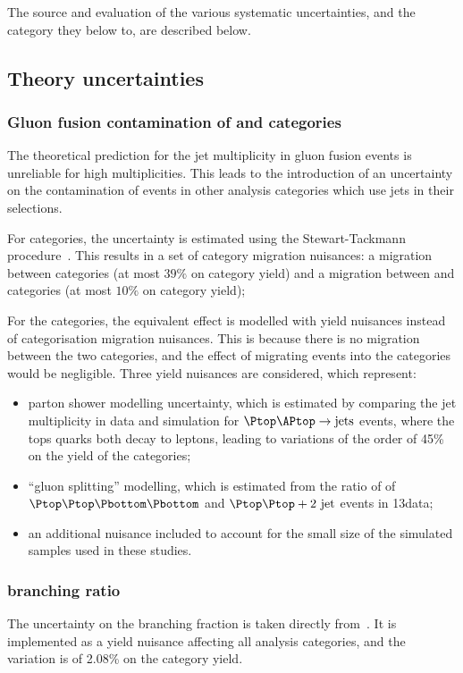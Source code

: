 The source and evaluation of the various systematic uncertainties, and the category they below to, are described below.

\subsection{Theory uncertainties}

\subsubsection{Gluon fusion contamination of \VBFTag and \TTHTag categories}
The theoretical prediction for the jet multiplicity in gluon fusion events is unreliable for high multiplicities. This leads to the introduction of an uncertainty on the contamination of \ggH events in other analysis categories which use jets in their selections. 

For \VBFTag categories, the uncertainty is estimated using the Stewart-Tackmann procedure~\cite{StewartTackmann}. This results in a set of category migration nuisances: a migration between \VBFTag categories (at most $39\%$ on category yield) and a migration between \Untagged and \VBFTag categories (at most $10\%$ on category yield); %

For the \TTHTag categories, the equivalent effect is modelled with yield nuisances instead of categorisation migration nuisances. This is because there is no migration between the two \TTHTag categories, and the effect of migrating events into the \Untagged categories would be negligible. Three yield nuisances are considered, which represent:
\begin{itemize}
\item parton shower modelling uncertainty, which is estimated by comparing the jet multiplicity in data and simulation for $\Ptop \APtop \rightarrow \text{jets}$ events, where the tops quarks both decay to leptons, leading to variations of the order of 45\% on the yield of the \TTHTag categories; 
\item ``gluon splitting'' modelling, which is estimated from the ratio of \crosssection\s of $\Ptop \Ptop \Pbottom \Pbottom$ and $\Ptop \Ptop +2\text{ jet}$ events in 13\TeV data;
\item an additional nuisance included to account for the small size of the simulated samples used in these studies.
\end{itemize}

\subsubsection{\Hgg branching ratio}
The uncertainty on the \SM \Hgg branching fraction is taken directly from~\cite{LHCHXSWGYR4}. It is implemented as a yield nuisance affecting all analysis categories, and the variation is of 2.08\% on the category yield.

